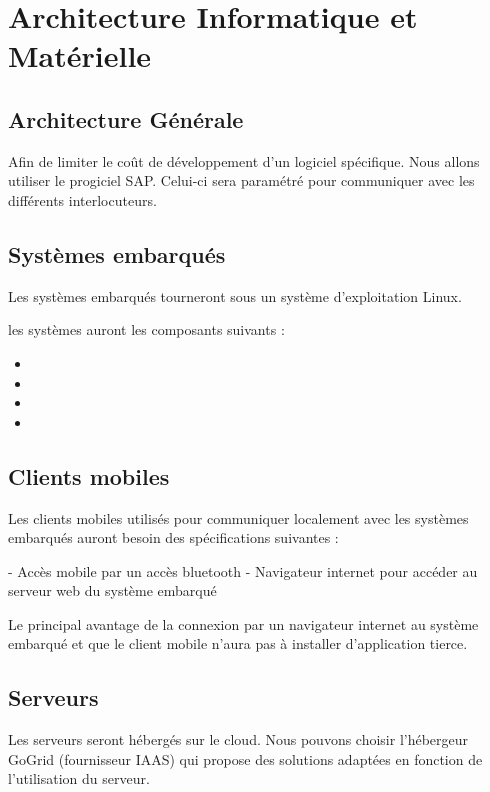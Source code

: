 \section{Architecture Informatique et Matérielle}

\subsection{Architecture Générale}
Afin de limiter le coût de développement d'un logiciel spécifique. 
Nous allons utiliser le progiciel SAP. Celui-ci sera paramétré pour
communiquer avec les différents interlocuteurs. 

\subsection{Systèmes embarqués}

Les systèmes embarqués tourneront sous un système d'exploitation Linux. 

les systèmes auront les composants suivants : 
\begin{itemize}
\item{}
\item{}
\item{}
\item{}
\end{itemize}



\subsection{Clients mobiles}

Les clients mobiles utilisés pour communiquer localement avec les systèmes embarqués auront besoin des spécifications suivantes : 

- Accès mobile par un accès bluetooth
- Navigateur internet pour accéder au serveur web du système embarqué

Le principal avantage de la connexion par un navigateur internet au système embarqué et que le client mobile n'aura pas à installer d'application tierce.

\subsection{Serveurs}

Les serveurs seront hébergés sur le cloud. Nous pouvons choisir l'hébergeur GoGrid (fournisseur IAAS) 
qui propose des solutions adaptées en fonction de l'utilisation du serveur.


